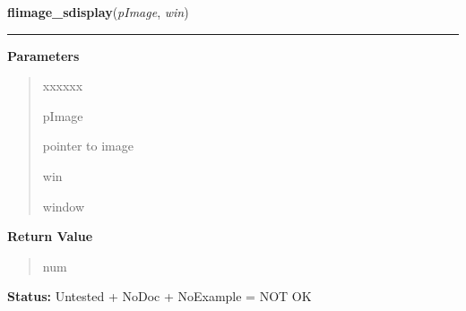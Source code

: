 \hspace{.8\funcindent}\begin{boxedminipage}{\funcwidth}

    \raggedright \textbf{flimage\_sdisplay}(\textit{pImage}, \textit{win})

    \vspace{-1.5ex}

    \rule{\textwidth}{0.5\fboxrule}
\setlength{\parskip}{2ex}
\setlength{\parskip}{1ex}
      \textbf{Parameters}
      \vspace{-1ex}

      \begin{quote}
        \begin{Ventry}{xxxxxx}

          \item[pImage]

          pointer to image

          \item[win]

          window

        \end{Ventry}

      \end{quote}

      \textbf{Return Value}
    \vspace{-1ex}

      \begin{quote}
      num

      \end{quote}

\textbf{Status:} Untested + NoDoc + NoExample = NOT OK



    \end{boxedminipage}

    \label{xformslib:library:flimage_convert}

    \vspace{0.5ex}

